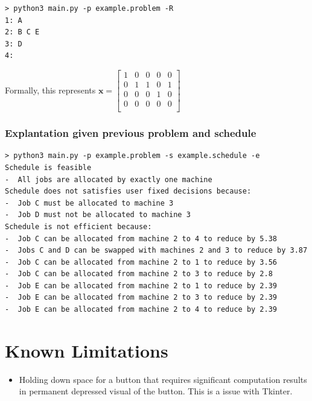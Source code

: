 \begin{verbatim}
> python3 main.py -p example.problem -R
1: A
2: B C E
3: D
4: 
\end{verbatim}

Formally, this represents $\mathbf{x}=\begin{bmatrix}
	1&0&0&0&0\\
	0&1&1&0&1\\
	0&0&0&1&0\\
	0&0&0&0&0\\
\end{bmatrix}$

\subsubsection{Explantation given previous problem and schedule}

\begin{verbatim}
> python3 main.py -p example.problem -s example.schedule -e
Schedule is feasible
-  All jobs are allocated by exactly one machine
Schedule does not satisfies user fixed decisions because:
-  Job C must be allocated to machine 3
-  Job D must not be allocated to machine 3
Schedule is not efficient because:
-  Job C can be allocated from machine 2 to 4 to reduce by 5.38
-  Jobs C and D can be swapped with machines 2 and 3 to reduce by 3.87
-  Job C can be allocated from machine 2 to 1 to reduce by 3.56
-  Job C can be allocated from machine 2 to 3 to reduce by 2.8
-  Job E can be allocated from machine 2 to 1 to reduce by 2.39
-  Job E can be allocated from machine 2 to 3 to reduce by 2.39
-  Job E can be allocated from machine 2 to 4 to reduce by 2.39
\end{verbatim}

\section{Known Limitations}

\begin{itemize}
	\item Holding down space for a button that requires significant computation results in permanent depressed visual of the button. This is a issue with Tkinter.
\end{itemize}